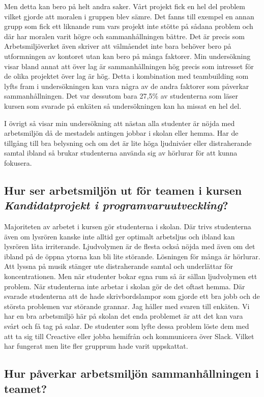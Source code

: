 Men detta kan bero på helt andra saker. Vårt projekt fick en hel del problem vilket gjorde att moralen i gruppen blev sämre. Det fanns till exempel en annan grupp som fick ett liknande rum vars projekt inte stötte på sådana problem och där har moralen varit högre och sammanhållningen bättre. Det är precis som Arbetsmiljöverket även skriver att välmåendet inte bara behöver bero på utformningen av kontoret utan kan bero på många faktorer. Min undersökning visar bland annat att över lag är sammanhållningen hög precis som intresset för de olika projektet över lag är hög. Detta i kombination med teambuilding som lyfts fram i undersökningen kan vara några av de andra faktorer som påverkar sammanhållningen. Det var dessutom bara 27,5\% av studenterna som läser kursen som svarade på enkäten så undersökningen kan ha missat en hel del.

I övrigt så visar min undersökning att nästan alla studenter är nöjda med arbetsmiljön då de mestadels antingen jobbar i skolan eller hemma. Har de tillgång till bra belysning och om det är lite höga ljudnivåer eller distraherande samtal ibland så brukar studenterna använda sig av hörlurar för att kunna fokusera. 

\subsection{Hur ser arbetsmiljön ut för teamen i kursen \textit{Kandidatprojekt i programvaruutveckling}?}
Majoriteten av arbetet i kursen gör studenterna i skolan. Där trivs studenterna även om lysrören kanske inte alltid ger optimalt arbetsljus och ibland kan lysrören låta irriterande. Ljudvolymen är de flesta också nöjda med även om det ibland på de öppna ytorna kan bli lite störande. Lösningen för många är hörlurar. Att lyssna på musik stänger ute distraherande samtal och underlättar för koncentrationen. Men när studenter bokar egna rum så är sällan ljudvolymen ett problem. När studenterna inte arbetar i skolan gör de det oftast hemma. Där svarade studenterna att de hade skrivbordslampor som gjorde ett bra jobb och de största problemen var störande grannar. Jag håller med svaren till enkäten. Vi har en bra arbetsmiljö här på skolan det enda problemet är att det kan vara svårt och få tag på salar. De studenter som lyfte dessa problem löste dem med att ta sig till Creactive eller jobba hemifrån och kommunicera över Slack. Vilket har fungerat men lite fler grupprum hade varit uppskattat. 

\subsection{Hur påverkar arbetsmiljön sammanhållningen i teamet?}
